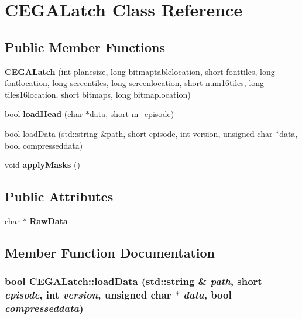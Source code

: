 \hypertarget{class_c_e_g_a_latch}{
\section{CEGALatch Class Reference}
\label{class_c_e_g_a_latch}
}
\subsection*{Public Member Functions}
\begin{DoxyCompactItemize}
\item 
\hypertarget{class_c_e_g_a_latch_ae5c11461590b7cbbcdda46c84ec8d570}{
{\bfseries CEGALatch} (int planesize, long bitmaptablelocation, short fonttiles, long fontlocation, long screentiles, long screenlocation, short num16tiles, long tiles16location, short bitmaps, long bitmaplocation)}
\label{class_c_e_g_a_latch_ae5c11461590b7cbbcdda46c84ec8d570}

\item 
\hypertarget{class_c_e_g_a_latch_a0a0bfcec4c08ef0f69ae1c5786ad714a}{
bool {\bfseries loadHead} (char $\ast$data, short m\_\-episode)}
\label{class_c_e_g_a_latch_a0a0bfcec4c08ef0f69ae1c5786ad714a}

\item 
bool \hyperlink{class_c_e_g_a_latch_a1a7d1da130603628a08f17c94c4b2664}{loadData} (std::string \&path, short episode, int version, unsigned char $\ast$data, bool compresseddata)
\item 
\hypertarget{class_c_e_g_a_latch_af5bf89b3db4461887971683f25d1eb7b}{
void {\bfseries applyMasks} ()}
\label{class_c_e_g_a_latch_af5bf89b3db4461887971683f25d1eb7b}

\end{DoxyCompactItemize}
\subsection*{Public Attributes}
\begin{DoxyCompactItemize}
\item 
\hypertarget{class_c_e_g_a_latch_a03a881a6fcc96cbc161d08d23155d33d}{
char $\ast$ {\bfseries RawData}}
\label{class_c_e_g_a_latch_a03a881a6fcc96cbc161d08d23155d33d}

\end{DoxyCompactItemize}


\subsection{Member Function Documentation}
\hypertarget{class_c_e_g_a_latch_a1a7d1da130603628a08f17c94c4b2664}{
\subsubsection[{loadData}]{\setlength{\rightskip}{0pt plus 5cm}bool CEGALatch::loadData (std::string \& {\em path}, \/  short {\em episode}, \/  int {\em version}, \/  unsigned char $\ast$ {\em data}, \/  bool {\em compresseddata})}}
\label{class_c_e_g_a_latch_a1a7d1da130603628a08f17c94c4b2664}



